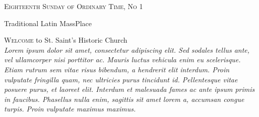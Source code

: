 \documentclass[10pt,a4paper]{article}
\newcommand{\JournalIssue}[1]{\hfill \textsc{Eighteenth Sunday of Ordinary Time, No #1}}
\newcommand{\SepRule}{\noindent
\begin{center}
	\hrulefill\hspace{0.2cm} \floweroneleft\floweroneright \hspace{0.2cm} \hrulefill
\end{center}
}
\newcommand{\JournalName}[2]{
\begin{center}	
	\Huge#1\linebreak\small#2
\end{center}
}
\newcommand{\IlluminateFirstChar}[3]{
	\large\lettrine[lines=5, lraise=-0.07, nindent=0.0em, slope=-0em]{\fontsize{85}{60}\usefont{U}{GoudyIn}{xl}{n}\color{BrickRed}#1}{#2}#3\vspace{0.1cm}\\
}
\begin{document}
\JournalIssue{1}
\JournalName{Traditional Latin Mass}{Place}
\vspace{0.5cm}

\begin{center}
\begin{minipage}[h]{0.75\linewidth}
	\IlluminateFirstChar{W}{elcome}{ to St. Saint's Historic Church}
	\emph{Lorem ipsum dolor sit amet, consectetur adipiscing elit. Sed sodales tellus ante, vel ullamcorper nisi porttitor ac. Mauris luctus vehicula enim eu scelerisque. Etiam rutrum sem vitae risus bibendum, a hendrerit elit interdum. Proin vulputate fringilla quam, nec ultricies purus tincidunt id. Pellentesque vitae posuere purus, et laoreet elit. Interdum et malesuada fames ac ante ipsum primis in faucibus. Phasellus nulla enim, sagittis sit amet lorem a, accumsan congue turpis. Proin vulputate maximus maximus.}
\end{minipage}
\end{center}

\vspace{0.5cm}
\SepRule
\vspace{0.5cm}
\end{document}
